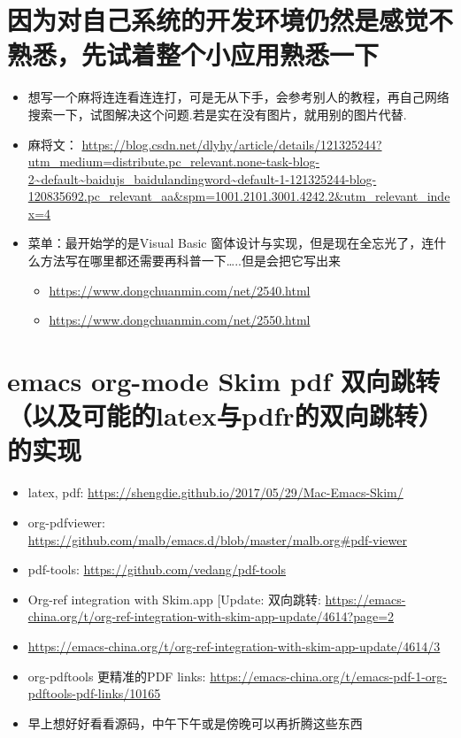\documentclass[9pt, b5paper]{article}
\begin{document}
\section{因为对自己系统的开发环境仍然是感觉不熟悉，先试着整个小应用熟悉一下}
\label{sec-9}
\begin{itemize}
\item 想写一个麻将连连看连连打，可是无从下手，会参考别人的教程，再自己网络搜索一下，试图解决这个问题.若是实在没有图片，就用别的图片代替.
\item 麻将文： \url{https://blog.csdn.net/dlyhy/article/details/121325244?utm_medium=distribute.pc_relevant.none-task-blog-2~default~baidujs_baidulandingword~default-1-121325244-blog-120835692.pc_relevant_aa&spm=1001.2101.3001.4242.2&utm_relevant_index=4}
\item 菜单：最开始学的是Visual Basic 窗体设计与实现，但是现在全忘光了，连什么方法写在哪里都还需要再科普一下\ldots{}..但是会把它写出来
\begin{itemize}
\item \url{https://www.dongchuanmin.com/net/2540.html}
\item \url{https://www.dongchuanmin.com/net/2550.html}
\end{itemize}
\end{itemize}
\section{{\bfseries\sffamily emacs} org-mode Skim pdf 双向跳转（以及可能的latex与pdfr的双向跳转）的实现}
\label{sec-10}
\begin{itemize}
\item latex, pdf: \url{https://shengdie.github.io/2017/05/29/Mac-Emacs-Skim/}
\item org-pdfviewer: \url{https://github.com/malb/emacs.d/blob/master/malb.org#pdf-viewer}
\item pdf-tools: \url{https://github.com/vedang/pdf-tools}
\item Org-ref integration with Skim.app [Update: 双向跳转: \url{https://emacs-china.org/t/org-ref-integration-with-skim-app-update/4614?page=2}
\item \url{https://emacs-china.org/t/org-ref-integration-with-skim-app-update/4614/3}
\item{} org-pdftools 更精准的PDF links: \url{https://emacs-china.org/t/emacs-pdf-1-org-pdftools-pdf-links/10165}
\item 早上想好好看看源码，中午下午或是傍晚可以再折腾这些东西
\end{itemize}
\end{document}
